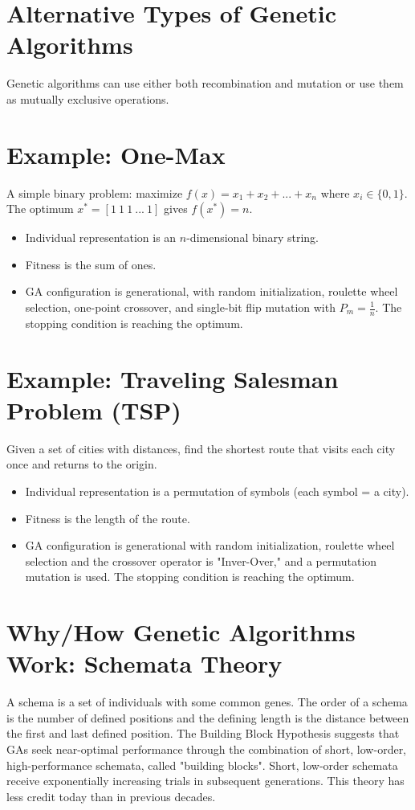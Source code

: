 \section{Alternative Types of Genetic Algorithms}
Genetic algorithms can use either both recombination and mutation or use them as mutually exclusive operations.

\section{Example: One-Max}
A simple binary problem: maximize \(f(x) = x_1 + x_2 + ... + x_n\) where \(x_i \in \{0, 1\}\).  The optimum \(x^* = [1 \ 1 \ 1 \ ... \ 1]\) gives \(f(x^*) = n\).
\begin{itemize}
    \item   Individual representation is an \(n\)-dimensional binary string.
    \item  Fitness is the sum of ones.
    \item   GA configuration is generational, with random initialization, roulette wheel selection, one-point crossover, and single-bit flip mutation with \(P_m = \frac{1}{n}\). The stopping condition is reaching the optimum.
\end{itemize}

\section{Example: Traveling Salesman Problem (TSP)}
Given a set of cities with distances, find the shortest route that visits each city once and returns to the origin.
\begin{itemize}
    \item Individual representation is a permutation of symbols (each symbol = a city).
     \item Fitness is the length of the route.
     \item GA configuration is generational with random initialization, roulette wheel selection and the crossover operator is "Inver-Over," and a permutation mutation is used. The stopping condition is reaching the optimum.
\end{itemize}

\section{Why/How Genetic Algorithms Work: Schemata Theory}
A schema is a set of individuals with some common genes. The order of a schema is the number of defined positions and the defining length is the distance between the first and last defined position. The Building Block Hypothesis suggests that GAs seek near-optimal performance through the combination of short, low-order, high-performance schemata, called "building blocks". Short, low-order schemata receive exponentially increasing trials in subsequent generations. This theory has less credit today than in previous decades.

